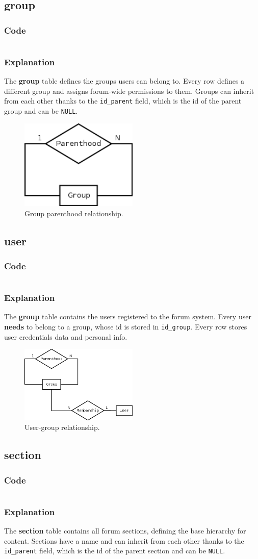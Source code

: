 \documentclass[12pt]{report}
\renewcommand\emph{\textbf}
\newcommand{\printSQLtest}[1]
{
    \inputminted[linenos, breaklines, breakbytoken, tabsize=4, fontsize=\footnotesize]{mysql}{#1}
}
\newcommand{\printSQLTablepage}[2]
{
    \newpage
    \subsection{#2}
    \subsubsection{Code}
    \printSQLtest{../sql/parts/#1}
    \subsubsection{Explanation}
}
\begin{document}
                \printSQLTablepage{03_tblGroup.sql}{group}
                    The \emph{group} table defines the groups users can belong to. Every row defines a different group and assigns forum-wide permissions to them.
                    Groups can inherit from each other thanks to the \texttt{id_parent} field, which is the id of the parent group and can be \texttt{NULL}.

                    \begin{figure}[h]
                    \caption{Group parenthood relationship.}
                    \centering
                    \includegraphics[width=0.5\textwidth]{td/03group}
                    \end{figure}

                \printSQLTablepage{04_tblUser.sql}{user}
                    The \emph{group} table contains the users registered to the forum system. Every user \emph{needs} to belong to a group, whose id is stored in \texttt{id_group}.
                    Every row stores user credentials data and personal info.

                    \begin{figure}[h]
                    \caption{User-group relationship.}
                    \centering
                    \includegraphics[width=0.5\textwidth]{td/04user}
                    \end{figure}

                \printSQLTablepage{05_tblSection.sql}{section}
                    The \emph{section} table contains all forum sections, defining the base hierarchy for content. Sections have a name and can inherit from each other thanks to the \texttt{id_parent} field, which is the id of the parent section and can be \texttt{NULL}.
\end{document}
